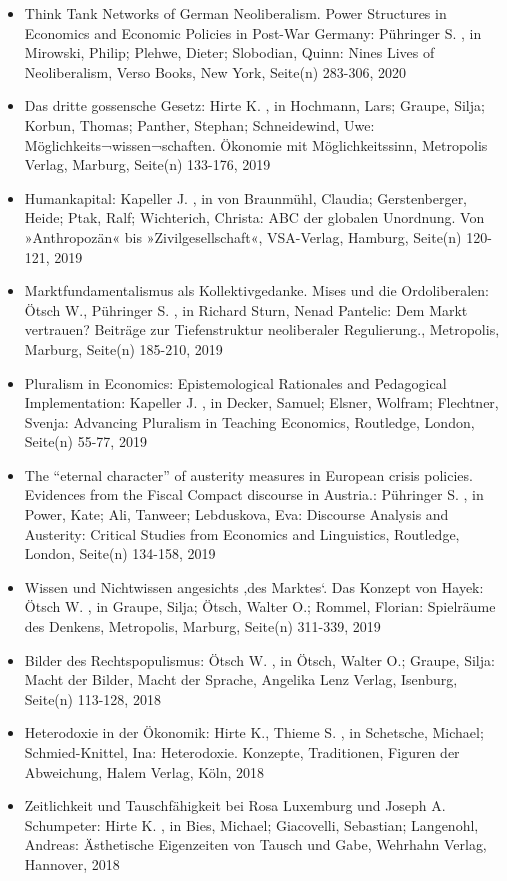 \begin{itemize}
\item Think Tank Networks of German Neoliberalism. Power Structures in Economics and Economic Policies in Post-War Germany: Pühringer S. , in Mirowski, Philip; Plehwe, Dieter; Slobodian, Quinn: Nines Lives of Neoliberalism, Verso Books, New York, Seite(n) 283-306, 2020
\item Das dritte gossensche Gesetz: Hirte K. , in Hochmann, Lars; Graupe, Silja; Korbun, Thomas; Panther, Stephan; Schneidewind, Uwe: Möglichkeits¬wissen¬schaften. Ökonomie mit Möglichkeitssinn, Metropolis Verlag, Marburg, Seite(n) 133-176, 2019
\item Humankapital: Kapeller J. , in von Braunmühl, Claudia; Gerstenberger, Heide; Ptak, Ralf; Wichterich, Christa: ABC der globalen Unordnung. Von »Anthropozän« bis »Zivilgesellschaft«, VSA-Verlag, Hamburg, Seite(n) 120-121, 2019
\item Marktfundamentalismus als Kollektivgedanke. Mises und die Ordoliberalen: Ötsch W., Pühringer S. , in Richard Sturn, Nenad Pantelic: Dem Markt vertrauen? Beiträge zur Tiefenstruktur neoliberaler Regulierung., Metropolis, Marburg, Seite(n) 185-210, 2019
\item Pluralism in Economics: Epistemological Rationales and Pedagogical Implementation: Kapeller J. , in Decker, Samuel; Elsner, Wolfram; Flechtner, Svenja: Advancing Pluralism in Teaching Economics, Routledge, London, Seite(n) 55-77, 2019
\item The “eternal character” of austerity measures in European crisis policies. Evidences from the Fiscal Compact discourse in Austria.: Pühringer S. , in Power, Kate; Ali, Tanweer; Lebduskova, Eva: Discourse Analysis and Austerity: Critical Studies from Economics and Linguistics, Routledge, London, Seite(n) 134-158, 2019
\item Wissen und Nichtwissen angesichts ‚des Marktes‘. Das Konzept von Hayek: Ötsch W. , in Graupe, Silja; Ötsch, Walter O.; Rommel, Florian: Spielräume des Denkens, Metropolis, Marburg, Seite(n) 311-339, 2019
\item Bilder des Rechtspopulismus: Ötsch W. , in Ötsch, Walter O.; Graupe, Silja: Macht der Bilder, Macht der Sprache, Angelika Lenz Verlag, Isenburg, Seite(n) 113-128, 2018
\item Heterodoxie in der Ökonomik: Hirte K., Thieme S. , in Schetsche, Michael; Schmied-Knittel, Ina: Heterodoxie. Konzepte, Traditionen, Figuren der Abweichung, Halem Verlag, Köln, 2018
\item Zeitlichkeit und Tauschfähigkeit bei Rosa Luxemburg und Joseph A. Schumpeter: Hirte K. , in Bies, Michael; Giacovelli, Sebastian; Langenohl, Andreas: Ästhetische Eigenzeiten von Tausch und Gabe, Wehrhahn Verlag, Hannover, 2018

\end{itemize}
